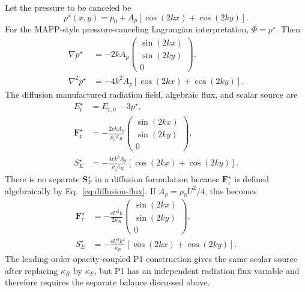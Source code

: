 \documentclass[11pt]{article}
\newcommand{\Grad}{\nabla}
\newcommand{\Er}{E_{\mathrm r}}
\newcommand{\Fr}{\bm{F}_{\mathrm r}}
\newcommand{\ShatE}{S_E}
\newcommand{\ShatF}{\bm{S}_F}
\newcommand{\Erzero}{E_{\mathrm r,0}}
\begin{document}
Let the pressure to be canceled be
\begin{equation}
  p^\star(x,y)
  =
  p_0 + A_p\left[\cos(2kx)+\cos(2ky)\right].
  \label{eq:generic-pressure}
\end{equation}
For the MAPP-style pressure-canceling Lagrangian interpretation,
\(\Phi=p^\star\).  Then
\begin{align}
  \Grad p^\star
  &=
  -2kA_p
  \begin{pmatrix}
    \sin(2kx)\\
    \sin(2ky)\\
    0
  \end{pmatrix},
  \label{eq:pressure-gradient}\\
  \nabla^2 p^\star
  &=
  -4k^2 A_p\left[\cos(2kx)+\cos(2ky)\right].
  \label{eq:pressure-laplacian}
\end{align}
The diffusion manufactured radiation field, algebraic flux, and scalar source
are
\begin{align}
  \Er^\star
  &=
  \Erzero - 3p^\star,
  \label{eq:pressure-erad}\\
  \Fr^\star
  &=
  -\frac{2ckA_p}{\rho_0\kappa_R}
  \begin{pmatrix}
    \sin(2kx)\\
    \sin(2ky)\\
    0
  \end{pmatrix},
  \label{eq:pressure-frad}\\
  \ShatE^\star
  &=
  -\frac{4ck^2A_p}{\rho_0\kappa_R}
  \left[\cos(2kx)+\cos(2ky)\right].
  \label{eq:pressure-source}
\end{align}
There is no separate \(\ShatF^\star\) in a diffusion formulation because
\(\Fr^\star\) is defined algebraically by Eq.~\eqref{eq:diffusion-flux}.
If \(A_p=\rho_0U^2/4\), this becomes
\begin{align}
  \Fr^\star
  &=
  -\frac{cU^2k}{2\kappa_R}
  \begin{pmatrix}
    \sin(2kx)\\
    \sin(2ky)\\
    0
  \end{pmatrix},
  \label{eq:canonical-frad}\\
  \ShatE^\star
  &=
  -\frac{cU^2k^2}{\kappa_R}
  \left[\cos(2kx)+\cos(2ky)\right].
  \label{eq:canonical-source}
\end{align}
The leading-order opacity-coupled P1 construction gives the same scalar
source after replacing \(\kappa_R\) by \(\kappa_F\), but P1 has an independent
radiation flux variable and therefore requires the separate balance discussed
above.
\end{document}
